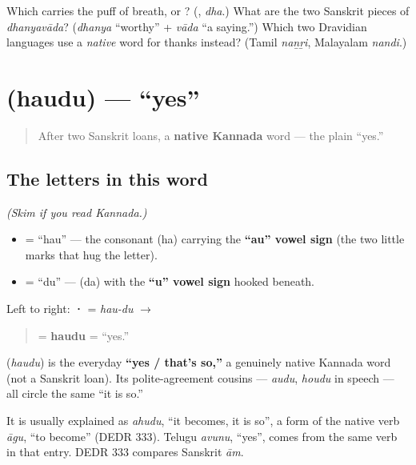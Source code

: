 \begin{tcolorbox}[breakable,colback=teal!4,colframe=teal!35!black,title={Before you move on}]
Which carries the puff of breath, \textbf{} or \textbf{}? (\textbf{}, \emph{dha}.) What are the two Sanskrit pieces of \emph{dhanyavāda}? (\emph{dhanya} \textquotedblleft{}worthy\textquotedblright{} + \emph{vāda} \textquotedblleft{}a saying.\textquotedblright{}) Which two Dravidian languages use a \emph{native} word for thanks instead? (Tamil \emph{naṉṟi}, Malayalam \emph{nandi}.)
\end{tcolorbox}
\section[\texorpdfstring{\kn{ಹೌದು} (haudu)}{ಹೌದು (haudu)}]{ (haudu) — \textquotedblleft{}yes\textquotedblright{}}

\label{lesson:KA-C01-haudu}



\begin{quote}
After two Sanskrit loans, a \textbf{native Kannada} word — the plain \textquotedblleft{}yes.\textquotedblright{}
\end{quote}

\subsection*{The letters in this word}
\emph{(Skim if you read Kannada.)}

\begin{itemize}
\raggedright
  \item \textbf{} = \textquotedblleft{}hau\textquotedblright{} — the consonant \textbf{} (ha) carrying the \textbf{\textquotedblleft{}au\textquotedblright{} vowel sign} (the two little marks that hug the letter).
  \item \textbf{} = \textquotedblleft{}du\textquotedblright{} — \textbf{} (da) with the \textbf{\textquotedblleft{}u\textquotedblright{} vowel sign} hooked beneath.
\end{itemize}

Left to right: \textbf{ · } = \emph{hau-du} $\to$

\begin{quote}
\textbf{} = \textbf{haudu} = \textquotedblleft{}yes.\textquotedblright{}
\end{quote}

\begin{cousinweb}
\textbf{} (\emph{haudu}) is the everyday \textbf{\textquotedblleft{}yes / that's so,\textquotedblright{}} a genuinely native Kannada word (not a Sanskrit loan). Its polite-agreement cousins — \emph{audu}, \emph{houdu} in speech — all circle the same \textquotedblleft{}it is so.\textquotedblright{}

It is usually explained as \emph{ahudu}, \textquotedblleft{}it becomes, it is so\textquotedblright{}, a form of the native verb \emph{āgu}, \textquotedblleft{}to become\textquotedblright{} (DEDR 333). Telugu \emph{avunu}, \textquotedblleft{}yes\textquotedblright{}, comes from the same verb in that entry. DEDR 333 compares Sanskrit \emph{ām}.
\end{cousinweb}

